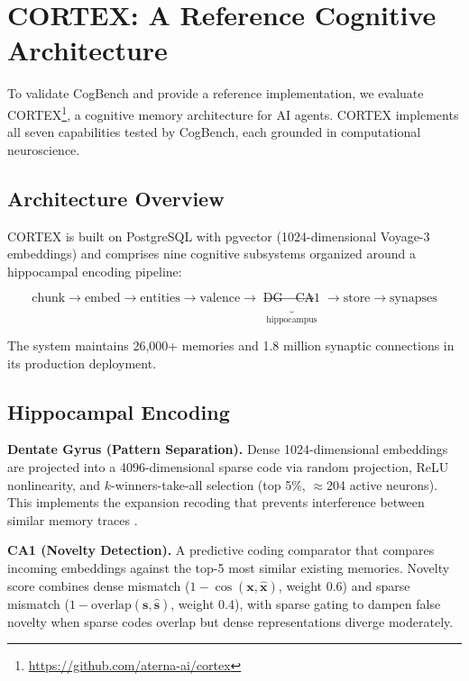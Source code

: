 \documentclass{article}
\begin{document}
\section{CORTEX: A Reference Cognitive Architecture}
\label{sec:cortex}

To validate CogBench and provide a reference implementation, we evaluate CORTEX\footnote{\url{https://github.com/aterna-ai/cortex}}, a cognitive memory architecture for AI agents. CORTEX implements all seven capabilities tested by CogBench, each grounded in computational neuroscience.

\subsection{Architecture Overview}

CORTEX is built on PostgreSQL with pgvector (1024-dimensional Voyage-3 embeddings) and comprises nine cognitive subsystems organized around a hippocampal encoding pipeline:

\begin{equation}
\text{chunk} \rightarrow \text{embed} \rightarrow \text{entities} \rightarrow \text{valence} \rightarrow \underbrace{\text{DG} \rightarrow \text{CA1}}_{\text{hippocampus}} \rightarrow \text{store} \rightarrow \text{synapses}
\end{equation}

The system maintains 26,000+ memories and 1.8 million synaptic connections in its production deployment.

\subsection{Hippocampal Encoding}

\textbf{Dentate Gyrus (Pattern Separation).} Dense 1024-dimensional embeddings are projected into a 4096-dimensional sparse code via random projection, ReLU nonlinearity, and $k$-winners-take-all selection (top 5\%, $\approx$204 active neurons). This implements the expansion recoding that prevents interference between similar memory traces \citep{rolls2013mechanisms}.

\textbf{CA1 (Novelty Detection).} A predictive coding comparator that compares incoming embeddings against the top-5 most similar existing memories. Novelty score combines dense mismatch ($1 - \cos(\mathbf{x}, \hat{\mathbf{x}})$, weight 0.6) and sparse mismatch ($1 - \text{overlap}(\mathbf{s}, \hat{\mathbf{s}})$, weight 0.4), with sparse gating to dampen false novelty when sparse codes overlap but dense representations diverge moderately.
\end{document}
